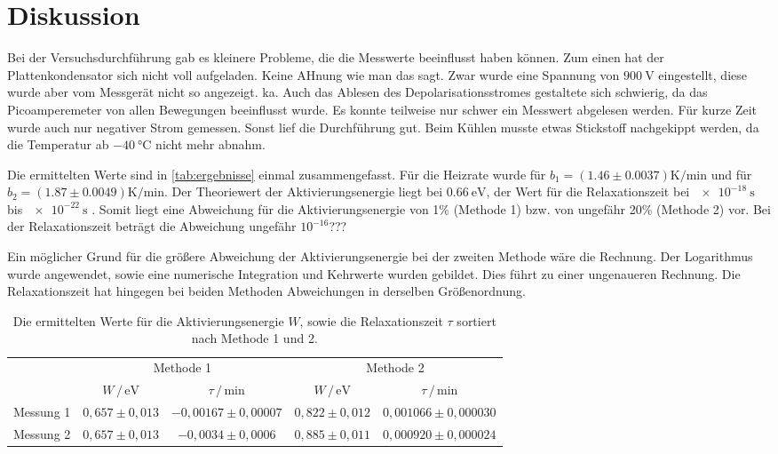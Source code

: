 \section{Diskussion}
\label{sec:Diskussion}

Bei der Versuchsdurchführung gab es kleinere Probleme, die die Messwerte beeinflusst haben können.
Zum einen hat der Plattenkondensator sich nicht voll aufgeladen. Keine AHnung wie man das sagt.
Zwar wurde eine Spannung von $\SI{900}{\volt}$ eingestellt, diese wurde aber vom Messgerät nicht so angezeigt. ka.
Auch das Ablesen des Depolarisationsstromes gestaltete sich schwierig, da das Picoamperemeter von allen Bewegungen beeinflusst wurde.
Es konnte teilweise nur schwer ein Messwert abgelesen werden.
Für kurze Zeit wurde auch nur negativer Strom gemessen.
Sonst lief die Durchführung gut.
Beim Kühlen musste etwas Stickstoff nachgekippt werden, da die Temperatur ab $\SI{-40}{\celsius}$ nicht mehr abnahm.

\noindent
Die ermittelten Werte sind in \autoref{tab:ergebnisse} einmal zusammengefasst.
Für die Heizrate wurde für $b_1 = (1.46\pm 0.0037) \si{\kelvin\per\minute}$ und für $b_2 = (1.87 \pm 0.0049) \si{\kelvin\per\minute}$.
Der Theoriewert der Aktivierungsenergie liegt bei $\SI{0.66}{\electronvolt}$, der Wert für die Relaxationszeit bei $\SI{e-18}{\second}$ bis $\SI{e-22}{\second}$ .
Somit liegt eine Abweichung für die Aktivierungsenergie von 1\% (Methode 1) bzw. von ungefähr 20\% (Methode 2) vor.
Bei der Relaxationszeit beträgt die Abweichung ungefähr $10^{-16}$???

\noindent
Ein möglicher Grund für die größere Abweichung der Aktivierungsenergie bei der zweiten Methode wäre die Rechnung.
Der Logarithmus wurde angewendet, sowie eine numerische Integration und Kehrwerte wurden gebildet.
Dies führt zu einer ungenaueren Rechnung.
Die Relaxationszeit hat hingegen bei beiden Methoden Abweichungen in derselben Größenordnung.

\begin{table}[h]
    \centering
    \caption{Die ermittelten Werte für die Aktivierungsenergie $W$, sowie die Relaxationszeit $\tau$ sortiert nach Methode 1 und 2.}
    \label{tab:ergebnisse}
    \begin{tabular}{c c c c c}
      \toprule
      &\multicolumn{2}{c}{Methode 1} &\multicolumn{2}{c}{Methode 2}\\
      \cmidrule(lr){2-3}\cmidrule(lr){4-5}
                   &$W \, / \, \si{\electronvolt}$  &$\tau \, / \, \si{\minute}$& $W \, / \, \si{\electronvolt}$    & $\tau \, / \, \si{\minute}$   \\
      \midrule
      Messung 1    & $0,657 \pm 0,013$              & $-0,00167 \pm 0,00007$    & $0,822 \pm 0,012$                 & $0,001066 \pm 0,000030$       \\   
      Messung 2    & $0,657 \pm 0,013$              & $-0,0034 \pm 0,0006 $     & $0,885 \pm 0,011$                 & $0,000920 \pm 0,000024$       \\   
      \bottomrule
    \end{tabular}
  \end{table}

